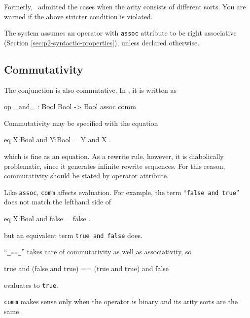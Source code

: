 \documentclass[a4paper]{memoir}
\begin{document}
\begin{warning}
  Formerly, \cafeobj~admitted the cases when the arity
  consists of different sorts. You are warned if the above stricter
  condition is violated.
\end{warning}

\begin{warning}
  The system assumes an operator with \verb|assoc| attribute to
  be right associative (Section \ref{sec:p2-syntactic-properties}),
  unless declared otherwise.
\end{warning}

\subsection{Commutativity}
The conjunction is also commutative. In \cafeobj, it is written as
\begin{vvtm}
\begin{ccode}
   op _and_ : Bool Bool -> Bool { assoc comm }
\end{ccode}
\end{vvtm}
Commutativity may be specified with the equation
\begin{vvtm}
\begin{ccode}
   eq X:Bool and Y:Bool = Y and X .
\end{ccode}
\end{vvtm}
which is fine as an equation. As a rewrite rule, however, it is
diabolically problematic, since it generates infinite rewrite sequences.
For this reason, commutativity should be stated by operator attribute.

Like \verb|assoc|, \verb|comm| affects evaluation. For example, the
term ``\verb|false and true|'' does not match the lefthand side of
\begin{vvtm}
\begin{ccode}
   eq X:Bool and false = false .
\end{ccode}
\end{vvtm}
but an equivalent term \verb|true and false| does.

``\verb|_==_|'' takes care of commutativity as well as associativity, so
\begin{vvtm}
\begin{ccode}
   true and (false and true) == (true and true) and false
\end{ccode}
\end{vvtm}
evaluates to \verb|true|.

\verb|comm| makes sense only when the operator is binary and its
arity sorts are the same.
\end{document}
